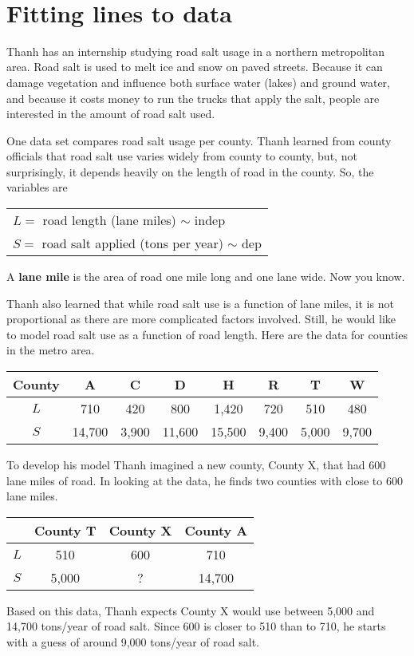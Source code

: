 ~\vspace{.1in}

\section{Fitting lines to data} 

Thanh has an internship studying road salt usage in a northern metropolitan area.   Road salt is used to melt ice and snow on paved streets.  Because it can damage vegetation and influence both surface water (lakes) and ground water, and because it costs money to run the trucks that apply the salt, people are interested in the amount of road salt used.

One data set compares road salt usage per county.  Thanh learned from county officials  that road salt use varies widely from county to county, but, not surprisingly, it depends heavily on the length of road in the county.
So, the variables are 
\begin{center}
\begin{tabular} {l} 
$L=$ road length (lane miles) $\sim$ indep \\
$S= $ road salt applied (tons per year) $\sim$ dep \\ 
\end{tabular}
\end{center}
A \textbf{lane mile} is the area of road one mile long and one lane wide.  Now you know.

Thanh also learned that while road salt use is a function of lane miles, it is not proportional as there are more complicated factors involved.  Still, he would like to model road salt use as a function of road length.  Here are the data for counties in the metro area.
\begin{center}
\begin{tabular} {|c| |c |c |c |c |c |c |c|}\hline
County & A & C & D & H & R & T & W\\ \hline
$L$ & 710 & 420  & 800 & 1,420 & 720 & 510 & 480\\ \hline
$S$ & 14,700 & 3,900  & 11,600 & 15,500 & 9,400 & 5,000 & 9,700 \\ \hline
\end{tabular}
\end{center}

To develop his model Thanh imagined a new county, County X, that had 600 lane miles of road.  In looking at the data, he finds two counties with close to 600 lane miles.
\begin{center}
\begin{tabular} {|c| |c |c |c|}\hline
& County T & County X &County A \\ \hline
$L$ &  510 & 600 & 710\\ \hline
$S$ &  5,000 & ? & 14,700 \\ \hline
\end{tabular}
\end{center}
Based on this data, Thanh expects County X would use between 5,000 and 14,700 tons/year of road salt.  Since 600 is closer to 510 than to 710, he starts with a guess of around 9,000 tons/year of road salt.  

